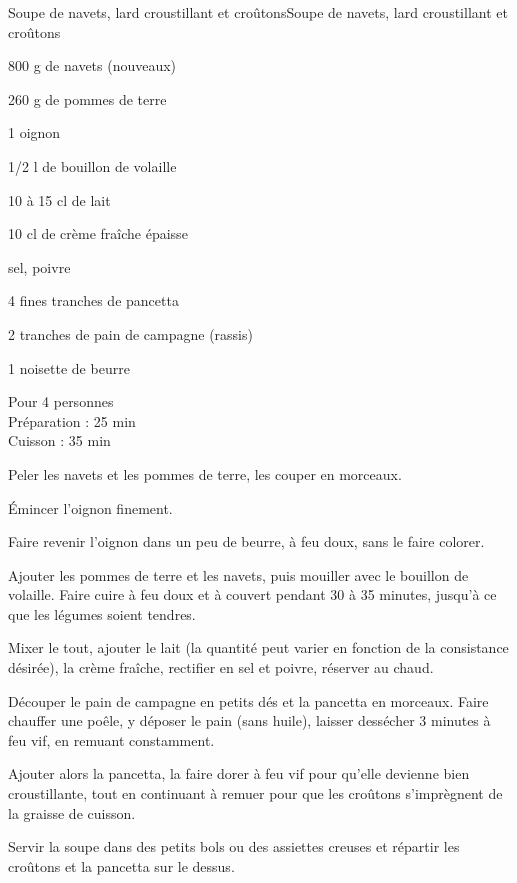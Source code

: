 \begin{recette}{Soupe de navets, lard croustillant et croûtons}{Soupe de navets, lard croustillant et croûtons}

\begin{ingredients}
800 g de navets (nouveaux)\par
260 g de pommes de terre\par
1 oignon\par
1/2 l de bouillon de volaille\par
10 à 15 cl de lait\par
10 cl de crème fraîche épaisse\par
sel, poivre\par
4 fines tranches de pancetta\par
2 tranches de pain de campagne (rassis)\par
1 noisette de beurre\par
\end{ingredients}

\begin{infos}
Pour 4 personnes\\
Préparation : 25 min\\
Cuisson : 35 min\\
\end{infos}

\begin{etapes}
\item Peler les navets et les pommes de terre, les couper en morceaux.
\item Émincer l'oignon finement.
\item Faire revenir l'oignon dans un peu de beurre, à feu doux, sans le faire colorer.
\item Ajouter les pommes de terre et les navets, puis mouiller avec le bouillon de volaille. Faire cuire à feu doux et à couvert pendant 30 à 35 minutes, jusqu'à ce que les légumes soient tendres.
\item Mixer le tout, ajouter le lait (la quantité peut varier en fonction de la consistance désirée), la crème fraîche, rectifier en sel et poivre, réserver au chaud.
\item Découper le pain de campagne en petits dés et la pancetta en morceaux. Faire chauffer une poêle, y déposer le pain (sans huile), laisser dessécher 3 minutes à feu vif, en remuant constamment.
\item Ajouter alors la pancetta, la faire dorer à feu vif pour qu'elle devienne bien croustillante, tout en continuant à remuer pour que les croûtons s'imprègnent de la graisse de cuisson.
\item Servir la soupe dans des petits bols ou des assiettes creuses et répartir les croûtons et la pancetta sur le dessus.
\end{etapes}

\end{recette}